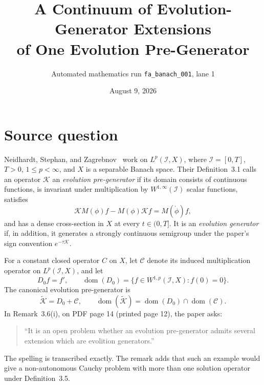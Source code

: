 \documentclass[11pt]{article}
\title{A Continuum of Evolution-Generator Extensions\\
of One Evolution Pre-Generator}
\author{Automated mathematics run \texttt{fa\_banach\_001}, lane 1}
\date{August 9, 2026}
\newcommand{\dom}{\operatorname{dom}}
\newcommand{\Ktilde}{\widetilde{\mathcal K}}
\newcommand{\I}{\mathcal I}
\begin{document}
\maketitle

\begin{center}
\end{center}

\section{Source question}

Neidhardt, Stephan, and Zagrebnov~\cite{NSZ} work on
$L^p(\I,X)$, where $\I=[0,T]$, $T>0$, $1\leq p<\infty$, and $X$ is a
separable Banach space.  Their Definition~3.1 calls an operator $\mathcal K$
an \emph{evolution pre-generator} if its domain consists of continuous
functions, is invariant under multiplication by $W^{1,\infty}(\I)$ scalar
functions, satisfies
\[
 \mathcal K M(\phi)f-M(\phi)\mathcal Kf=M(\dot\phi)f,
\]
and has a dense cross-section in $X$ at every $t\in(0,T]$.  It is an
\emph{evolution generator} if, in addition, it generates a strongly
continuous semigroup under the paper's sign convention $e^{-\tau\mathcal K}$.

For a constant closed operator $C$ on $X$, let $\mathcal C$ denote its
induced multiplication operator on $L^p(\I,X)$, and let
\[
 D_0 f=f',\qquad
 \dom(D_0)=\{f\in W^{1,p}(\I,X):f(0)=0\}.
\]
The canonical evolution pre-generator is
\begin{equation}\label{eq:pregenerator}
 \Ktilde=D_0+\mathcal C,
 \qquad \dom(\Ktilde)=\dom(D_0)\cap\dom(\mathcal C).
\end{equation}
In Remark~3.6(i), on PDF page 14 (printed page 12), the paper asks:
\begin{quote}
``It is an open problem whether an evolution pre-generator admits several
extension which are evolition generators.''
\end{quote}
The spelling is transcribed exactly.  The remark adds that such an example
would give a non-autonomous Cauchy problem with more than one solution
operator under Definition~3.5.
\end{document}
